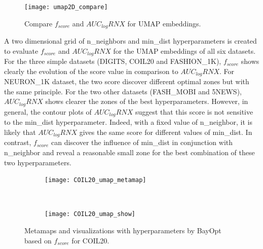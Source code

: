 \begin{figure}[ht!]
    \centering
    \texttt{[image: umap2D\_compare]}
    \caption{Compare $f_{score}$ and $AUC_{log}RNX$ for UMAP embeddings.}
    \label{fig:score:umap2D:compare}
\end{figure}

A two dimensional grid of {n\_neighbors} and {min\_dist} hyperparameters is created to evaluate $f_{score}$ and $AUC_{log}RNX$ for the UMAP embeddings of all six datasets.
For the three simple datasets (DIGITS, COIL20 and {FASHION\_1K}), $f_{score}$ shows clearly the evolution of the score value in comparison to $AUC_{log}RNX$.
For {NEURON\_1K} dataset, the two score discover different optimal zones but with the same principle.
For the two other datasets ({FASH\_MOBI} and 5NEWS), $AUC_{log}RNX$ shows clearer the zones of the best hyperparameters.
However, in general, the contour plots of $AUC_{log}RNX$ suggest that this score is not sensitive to the {min\_dist} hyperparameter.
Indeed, with a fixed value of {n\_neighbor}, it is likely that $AUC_{log}RNX$ gives the same score for different values of {min\_dist}.
In contrast, $f_{score}$ can discover the influence of {min\_dist} in conjunction with {n\_neighbor} and reveal a reasonable small zone for the best combination of these two hyperparameters.

\begin{figure}[ht!]
    \centering
    \begin{subfigure}[b]{\linewidth}
        \centering
        \texttt{[image: COIL20\_umap\_metamap]}
    \end{subfigure}
    ~
    \begin{subfigure}[b]{\linewidth}
        \texttt{[image: COIL20\_umap\_show]}
    \end{subfigure}
    \caption{Metamaps and visualizations with hyperparameters by BayOpt based on $f_{score}$ for COIL20.}
    \label{fig:umap:meta:COIL20}
\end{figure}

